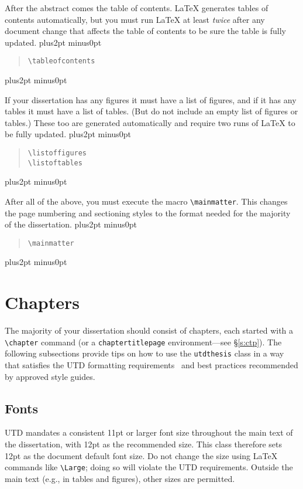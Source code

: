 \documentclass[doublespacing]{utdthesis}
\let\cite=\citep
\newenvironment{exampleclasscode}
 {\parindent=1cm\vskip0pt plus2pt minus0pt\begin{verse}}
 {\end{verse}\vskip0pt plus2pt minus0pt}
\begin{document}
After the abstract comes the table of contents.
\LaTeX{} generates tables of contents automatically, but you must run \LaTeX{}
at least \emph{twice} after any document change that affects the table of
contents to be sure the table is fully updated.
\begin{exampleclasscode}
\verb|\tableofcontents|
\end{exampleclasscode}

If your dissertation has any figures it must have a list of figures, and if it
has any tables it must have a list of tables.
(But do not include an empty list of figures or tables.)
These too are generated automatically and require two runs of \LaTeX{} to be
fully updated.
\begin{exampleclasscode}
\verb|\listoffigures| \\
\verb|\listoftables|
\end{exampleclasscode}

After all of the above, you must execute the macro \verb|\mainmatter|.
This changes the page numbering and sectioning styles to the format needed for
the majority of the dissertation.
\begin{exampleclasscode}
\verb|\mainmatter|
\end{exampleclasscode}

\section{Chapters}
\label{s:chapters}

The majority of your dissertation should consist of chapters, each started
with a \verb|\chapter| command (or a \verb|chaptertitlepage|
environment---see \S\ref{s:ctp}).
The following subsections provide tips on how to use the \texttt{utdthesis}
class in a way that satisfies the UTD formatting requirements~\cite{utdguide}
and best practices recommended by approved style guides.

\subsection{Fonts}
\label{s:fonts}

UTD mandates a consistent 11pt or larger font size throughout the main text
of the dissertation, with 12pt as the recommended size.
This class therefore sets 12pt as the document default font size.
Do not change the size using \LaTeX{} commands like \verb|\Large|;
doing so will violate the UTD requirements.
Outside the main text (e.g., in tables and figures), other sizes are permitted.
\end{document}
